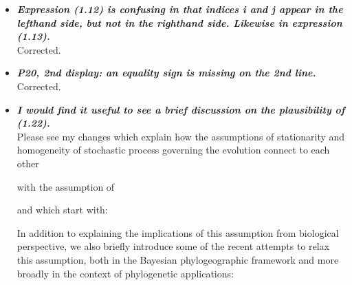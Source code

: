 \documentclass[english]{article}
\begin{document}
\begin{itemize}
\begin{quote}
\myeditsvthree
\end{quote}


\item {
{\it
\textbf{
Expression (1.12) is confusing in that indices i and j appear in the lefthand side, but not in the righthand side. 
Likewise in expression (1.13).
}%
}%
}%
\\
Corrected.



\item {
{\it
\textbf{
P20, 2nd display: an equality sign is missing on the 2nd line.
}%
}%
}%
\\
Corrected.

\item {
{\it
\textbf{
I would find it useful to see a brief discussion on the plausibility of (1.22).
}%
}%
}%
\\
Please see my changes which explain how the assumptions of stationarity and homogeneity of stochastic process governing the evolution connect to each other  

with the assumption of 

and which start with:

\begin{quote}
\myeditsvsixone
\end{quote}



In addition to explaining the implications of this assumption from biological perspective, we also briefly introduce some of the recent attempts to relax this assumption, both in the Bayesian phylogeographic framework and more broadly in the context of phylogenetic applications:


\end{itemize}
\end{document}
